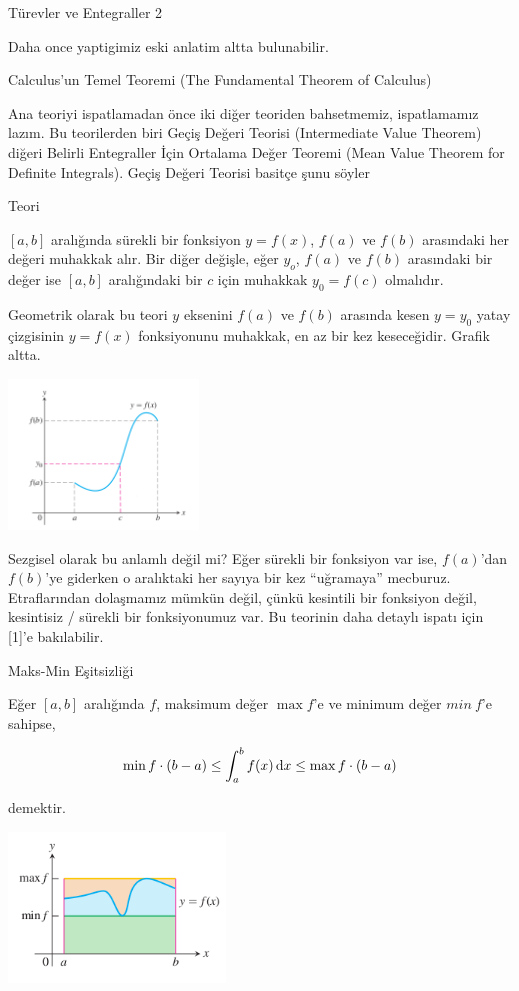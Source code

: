\documentclass[12pt,fleqn]{article}\usepackage{../../common}
\begin{document}
Türevler ve Entegraller 2

Daha once yaptigimiz eski anlatim altta bulunabilir.

Calculus'un Temel Teoremi (The Fundamental Theorem of Calculus)

Ana teoriyi ispatlamadan önce iki diğer teoriden bahsetmemiz, ispatlamamız
lazım. Bu teorilerden biri Geçiş Değeri Teorisi (Intermediate Value
Theorem) diğeri Belirli Entegraller İçin Ortalama Değer Teoremi (Mean Value
Theorem for Definite Integrals). Geçiş Değeri Teorisi basitçe şunu söyler

Teori

$[a,b]$ aralığında sürekli bir fonksiyon $y=f(x)$, $f(a)$ ve $f(b)$
arasındaki her değeri muhakkak alır. Bir diğer değişle, eğer $y_o$, $f(a)$
ve $f(b)$ arasındaki bir değer ise $[a,b]$ aralığındaki bir $c$ için
muhakkak $y_0 = f(c)$ olmalıdır. 

Geometrik olarak bu teori $y$ eksenini $f(a)$ ve $f(b)$ arasında kesen
$y=y_0$ yatay çizgisinin $y=f(x)$ fonksiyonunu muhakkak, en az bir kez
keseceğidir. Grafik altta. 

\includegraphics[height=4cm]{calc_multi_app_05.png}

Sezgisel olarak bu anlamlı değil mi? Eğer sürekli bir fonksiyon var ise,
$f(a)$'dan $f(b)$'ye giderken o aralıktaki her sayıya bir kez ``uğramaya''
mecburuz. Etraflarından dolaşmamız mümkün değil, çünkü kesintili bir
fonksiyon değil, kesintisiz / sürekli bir fonksiyonumuz var. Bu teorinin
daha detaylı ispatı için [1]'e bakılabilir. 

Maks-Min Eşitsizliği

Eğer $[a,b]$ aralığında $f$, maksimum değer $\max f$'e ve minimum değer
$min \ f$'e sahipse, 

$$ \min f \cdot (b-a) \le \int_a^b f(x) \,\mathrm{d} x \le \max f \cdot (b-a) $$

demektir. 

\includegraphics[height=4cm]{calc_multi_app_08.png}
\end{document}
